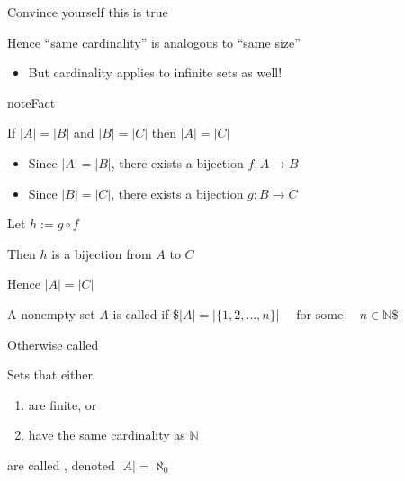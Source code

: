 \documentclass[letterpaper,10pt,english]{jupyterBook}
\begin{document}
\sphinxAtStartPar
{} Convince yourself this is true

\sphinxAtStartPar
Hence “same cardinality” is analogous to “same size”
\begin{itemize}
\item {} 
\sphinxAtStartPar
But cardinality applies to infinite sets as well!

\end{itemize}

\begin{sphinxadmonition}{note}{Fact}

\sphinxAtStartPar
If \(|A| = |B|\) and \(|B| = |C|\) then \(|A| = |C|\)
\end{sphinxadmonition}

\sphinxAtStartPar
{}
\begin{itemize}
\item {} 
\sphinxAtStartPar
Since \(|A| = |B|\), there exists a bijection \(f \colon A \to B\)

\item {} 
\sphinxAtStartPar
Since \(|B| = |C|\), there exists a bijection \(g \colon B \to C\)

\end{itemize}

\sphinxAtStartPar
Let \(h := g \circ f\)

\sphinxAtStartPar
Then \(h\) is a bijection from \(A\) to \(C\)

\sphinxAtStartPar
Hence \(|A| = |C|\)

\sphinxAtStartPar
A nonempty set \(A\) is called  if
\$\(
|A| = |\{1, 2, \ldots, n\}|
\quad \text{ for some } \quad
n \in \mathbb{N}
\)\$

\sphinxAtStartPar
Otherwise called 

\sphinxAtStartPar
Sets that either
\begin{enumerate}
%
\item {} 
\sphinxAtStartPar
are finite, or

\item {} 
\sphinxAtStartPar
have the same cardinality as \(\mathbb{N}\)

\end{enumerate}

\sphinxAtStartPar
are called , denoted \(|A| = \aleph_0\)
\end{document}
